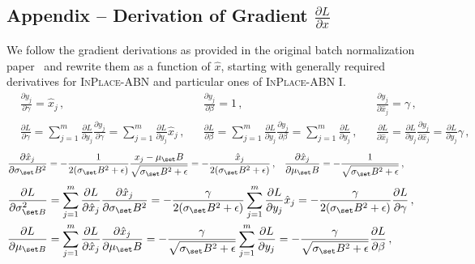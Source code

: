 \documentclass[10pt,twocolumn,letterpaper]{article}
\newcommand{\bnInplace}{\textsc{InPlace-ABN}\xspace}
\begin{document}
\begin{widetext}
\section*{Appendix -- Derivation of Gradient \boldmath $\frac{\partial L}{\partial x}$}\label{sec:Appendix}
We follow the gradient derivations as provided in the original batch normalization paper~\cite{IofSze15} and rewrite them as a function of $\hat x$, starting with generally required derivatives for \bnInplace and particular ones of \bnInplace I.
\begin{align*}
	&\frac{\partial y_j}{\partial \gamma} = \hat x_j\,,&&\frac{\partial y_j}{\partial \beta} = 1\,,&&\frac{\partial y_j}{\partial \hat x_j}=\gamma\,,\\
	&\frac{\partial L}{\partial \gamma}=\sum_{j=1}^m \frac{\partial L}{\partial y_j}\frac{\partial y_j}{\partial \gamma}=\sum_{j=1}^m\frac{\partial L}{\partial y_j}\hat x_j\,,&
	&\frac{\partial L}{\partial \beta}=\sum_{j=1}^m \frac{\partial L}{\partial y_j}\frac{\partial y_j}{\partial \beta}=\sum_{j=1}^m\frac{\partial L}{\partial y_j}\,,&
	&\frac{\partial  L}{\partial \hat x_j}=\frac{\partial L}{\partial y_j}\frac{\partial y_j}{\partial \hat x_j}=\frac{\partial L}{\partial y_j}\gamma\,,
\end{align*}
\begin{align*}
	&\frac{\partial \hat x_j}{\partial \sigma_\set B^2}=-\frac{1}{2(\sigma_\set B^2+\epsilon)}\frac{x_j-\mu_\set B}{\sqrt{\sigma_\set B^2+\epsilon}}=-\frac{\hat x_j}{2(\sigma_\set B^2+\epsilon)}\,,&
	&\frac{\partial \hat x_j}{\partial \mu_\set B}=-\frac{1}{\sqrt{\sigma_\set B^2+\epsilon}}\,,
\end{align*}
\begin{align*}
	\frac{\partial  L}{\partial \sigma^2_{\set B}}&=\sum_{j=1}^m\frac{\partial L}{\partial \hat x_j}\frac{\partial\hat x_j}{\partial \sigma_\set B^2}=-\frac{\gamma}{2(\sigma_\set B^2+\epsilon)}\sum_{j=1}^m\frac{\partial L}{\partial y_j}\hat x_j=-\frac{\gamma}{2(\sigma_\set B^2+\epsilon)}\frac{\partial L}{\partial \gamma}\,,\\
	\frac{\partial  L}{\partial\mu_{\set B}}&=\sum_{j=1}^m\frac{\partial L}{\partial \hat x_j}\frac{\partial \hat x_j}{\partial \mu_\set B}=-\frac{\gamma}{\sqrt{\sigma_\set B^2+\epsilon}}\sum_{j=1}^m\frac{\partial L}{\partial y_j}=-\frac{\gamma}{\sqrt{\sigma_\set B^2+\epsilon}}\frac{\partial L}{\partial \beta}\,,
\end{align*}


\end{widetext}
\end{document}
